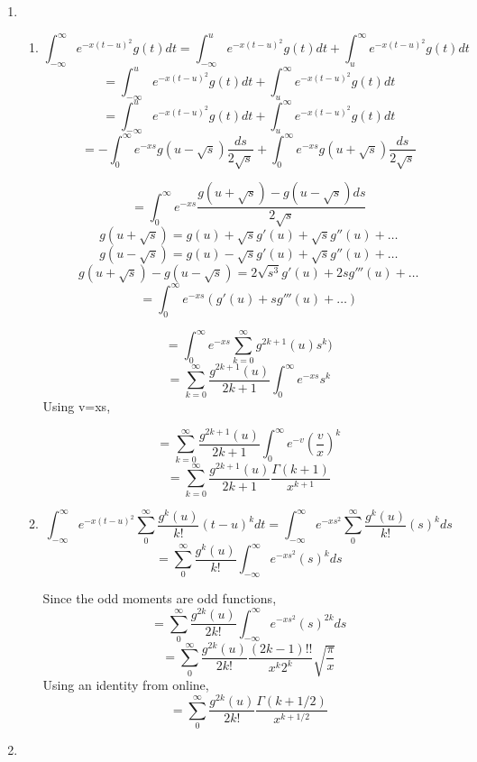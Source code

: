 \documentclass[a4paper]{article}
\begin{document}
\begin{enumerate}
\begin{enumerate}
\end{enumerate}	
	    	
\item
\begin{enumerate}
	\item 
			\[ \int_{-\infty}^{\infty} e^{-x(t-u)^2}g(t)dt = \int_{-\infty}^{u} e^{-x(t-u)^2}g(t)dt + \int_{u}^{\infty} e^{-x(t-u)^2}g(t)dt \]  
\[ = \int_{-\infty}^{u} e^{-x(t-u)^2}g(t)dt + \int_{u}^{\infty} e^{-x(t-u)^2}g(t)dt \] 
\[ = \int_{-\infty}^{u} e^{-x(t-u)^2}g(t)dt + \int_{u}^{\infty} e^{-x(t-u)^2}g(t)dt \] 
\[ =  - \int_{0}^{\infty} e^{-xs}g(u-\sqrt{s})\frac{ds}{2\sqrt{s}} + \int_{0}^{\infty} e^{-xs}g(u+\sqrt{s})\frac{ds}{2\sqrt{s}} \]  

\[ =   \int_{0}^{\infty} e^{-xs}\frac{g(u+\sqrt{s})-g(u-\sqrt{s})ds}{2\sqrt{s}} \]  
\[g(u+\sqrt{s}) = g(u)+  \sqrt{s}g'(u)+ \sqrt{s}g''(u) +\ldots\]
\[g(u-\sqrt{s}) = g(u)- \sqrt{s}g'(u)+ \sqrt{s}g''(u) +\ldots\]
\[g(u+\sqrt{s}) -g(u-\sqrt{s}) = 2\sqrt{s^3}g'(u)+ 2sg'''(u) +\ldots\]
\[ =   \int_{0}^{\infty} e^{-xs}(g'(u)+ sg'''(u) +\ldots ) \]

\[ =   \int_{0}^{\infty} e^{-xs}\sum_{k=0}^{\infty} g^{2k+1}(u)s^k ) \]	
\[ =  \sum_{k=0}^{\infty} \frac{g^{2k+1}(u)}{2k+1} \int_{0}^{\infty} e^{-xs}s^k  \]
Using v=xs,

\[ =  \sum_{k=0}^{\infty}\frac{ g^{2k+1}(u)}{2k+1} \int_{0}^{\infty} e^{-v}(\frac{v}{x})^k  \]
\[ =  \sum_{k=0}^{\infty} \frac{g^{2k+1}(u)}{2k+1}  \frac{\Gamma(k+1)}{x^{k+1}}   \]		
	\item 
	\[ \int_{-\infty}^{\infty} e^{-x(t-u)^2}  \sum_{0}^{\infty} \frac{g^k(u)}{k!}(t-u)^k dt =  \int_{-\infty}^{\infty} e^{-xs^2}  \sum_{0}^{\infty} \frac{g^k(u)}{k!}(s)^k ds\]
		\[  =  \sum_{0}^{\infty} \frac{g^k(u)}{k!} \int_{-\infty}^{\infty} e^{-xs^2}  (s)^k ds \]

Since the odd moments are odd functions,
				\[  =  \sum_{0}^{\infty} \frac{g^{2k}(u)}{2k!} \int_{-\infty}^{\infty} e^{-xs^2}  (s)^{2k} ds\]
				\[  =  \sum_{0}^{\infty} \frac{g^{2k}(u)}{2k!} \frac{(2k-1)!!}{x^k 2^k} \sqrt{\frac{\pi}{x}} \]	
Using an identity from online,							
				\[  =  \sum_{0}^{\infty} \frac{g^{2k}(u)}{2k!} \frac{\Gamma(k+1/2)}{x^{k+1/2} }  \]					
\end{enumerate}

\item


\end{enumerate}
\end{document}
